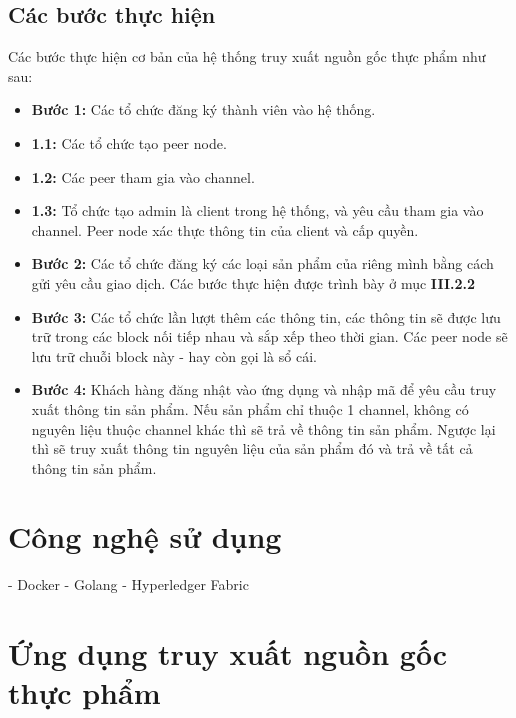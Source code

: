\subsection{Các bước thực hiện}
Các bước thực hiện cơ bản của hệ thống truy xuất nguồn gốc thực phẩm như sau:
\begin{itemize}
    \item \textbf{Bước 1:} Các tổ chức đăng ký thành viên vào hệ thống.
        \item \textbf{1.1:} Các tổ chức tạo peer node. 
        \item \textbf{1.2:} Các peer tham gia vào channel.
        \item \textbf{1.3:} Tổ chức tạo admin là client trong hệ thống, và yêu cầu
        tham gia vào channel. Peer node xác thực thông tin của client và cấp quyền.
    \item \textbf{Bước 2:} Các tổ chức đăng ký các loại sản phẩm của riêng mình bằng cách 
    gửi yêu cầu giao dịch. Các bước thực hiện được trình bày ở mục \textbf{III.2.2}
    \item \textbf{Bước 3:} Các tổ chức lần lượt thêm các thông tin, các thông tin sẽ được
    lưu trữ trong các block nối tiếp nhau và sắp xếp theo thời gian. Các peer node sẽ lưu 
    trữ chuỗi block này - hay còn gọi là sổ cái.
    \item \textbf{Bước 4:} Khách hàng đăng nhật vào ứng dụng và nhập mã để yêu cầu truy xuất
    thông tin sản phẩm. Nếu sản phẩm chỉ thuộc 1 channel, không có nguyên liệu thuộc channel
    khác thì sẽ trả về thông tin sản phẩm. Ngược lại thì sẽ truy xuất thông tin nguyên liệu
    của sản phẩm đó và trả về tất cả thông tin sản phẩm.
\end{itemize}

\section{Công nghệ sử dụng}
- Docker
- Golang
- Hyperledger Fabric 


\section{Ứng dụng truy xuất nguồn gốc thực phẩm}
